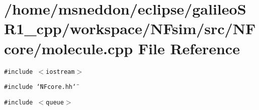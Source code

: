 \section{/home/msneddon/eclipse/galileoSR1\_\-cpp/workspace/NFsim/src/NFcore/molecule.cpp File Reference}
\label{molecule_8cpp}


{\tt \#include $<$iostream$>$}\par
{\tt \#include \char`\"{}NFcore.hh\char`\"{}}\par
{\tt \#include $<$queue$>$}\par

